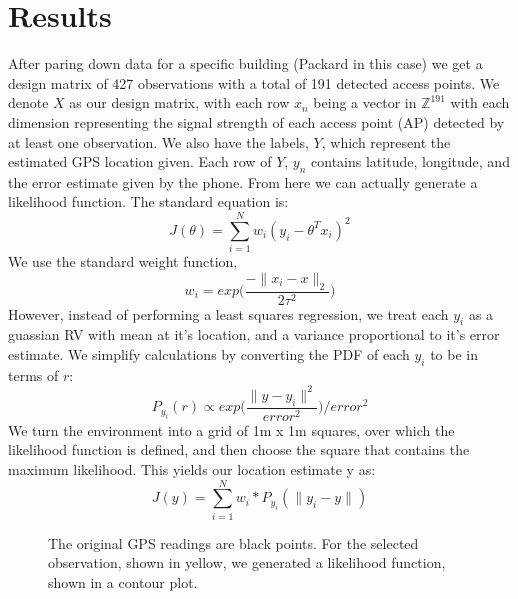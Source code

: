 \section{Results}
After paring down data for a specific building (Packard in this case)
we get a design matrix of 427 observations with a total of 191 detected
access points. We denote $X$ as our design matrix, with each row 
$x_n$ being a vector in $\mathbb{Z}^{191}$ with each dimension representing
the signal strength of each access point (AP) detected by at least 
one observation.  We also have the labels, $Y$, which represent the 
estimated GPS location given. Each row of $Y$, $y_n$ contains latitude,
longitude, and the error estimate given by the phone.  From here we can actually
generate a likelihood function. The standard equation is:
\begin{equation}
    J(\theta)= \sum_{i=1}^{N} w_i(y_i - \theta^T x_i)^2
\end{equation}
We use the standard weight function, 
\begin{equation} 
    w_i = exp \Bigg( \frac {-\| x_i - x \|_2} {2 \tau^2} \Bigg)
\end{equation}
However, instead of performing a least squares regression, 
we treat each $y_i$ as a guassian RV with mean at it's location, and 
a variance proportional to it's error estimate. We simplify calculations
by converting the PDF of each $y_i$ to be in terms of $r$:
\begin{equation} 
    P_{y_i}(r) \propto exp \Bigg( \frac{\| y - y_i \|^2} {error^2} \Bigg) / error^2
\end{equation}
We turn the environment into a grid of 1m x 1m squares, over which the likelihood
function is defined, and then choose the square that contains the maximum likelihood.
This yields our location estimate y as:
\begin{equation}
    J(y)= \sum_{i=1}^{N} w_i * P_{y_i}(\|y_i - y\|)
\end{equation}

\begin{figure}
\caption{The original GPS readings are black points. For the selected
observation, shown in yellow, we generated a likelihood function, shown in a contour plot.}
\end{figure}

